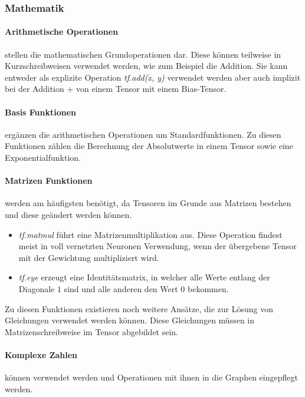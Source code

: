 \subsubsection{Mathematik} 

\paragraph{Arithmetische Operationen} stellen die mathematischen Grundoperationen dar. 
Diese können teilweise in Kurzschreibweisen verwendet werden, wie zum Beispiel die Addition. 
Sie kann entweder als explizite Operation \textit{tf.add(x, y)} verwendet werden aber auch implizit bei der Addition $+$ von einem Tensor mit einem Bias-Tensor.

\paragraph{Basis Funktionen} ergänzen die arithmetischen Operationen um Standardfunktionen. 
Zu diesen Funktionen zählen die Berechnung der Absolutwerte in einem Tensor sowie eine Exponentialfunktion. 

\paragraph{Matrizen Funktionen} werden am häufigsten benötigt, da Tensoren im Grunde aus Matrizen bestehen und  diese geändert werden können. 
\begin{itemize}
	\item \textit{tf.matmul} führt eine Matrizenmultiplikation aus. 
	Diese Operation findest meist in voll vernetzten Neuronen Verwendung, wenn der übergebene Tensor mit der Gewichtung multipliziert wird. 
	\item \textit{tf.eye} erzeugt eine Identitätsmatrix, in welcher alle Werte entlang der Diagonale $1$ sind und alle anderen den Wert $0$ bekommen. 
\end{itemize}

\noindent
Zu diesen Funktionen existieren noch weitere Ansätze, die zur Lösung von Gleichungen verwendet werden können. 
Diese Gleichungen müssen in Matrizenschreibweise im Tensor abgebildet sein. 

\paragraph{Komplexe Zahlen} können verwendet werden und Operationen mit ihnen in die Graphen eingepflegt werden. 

